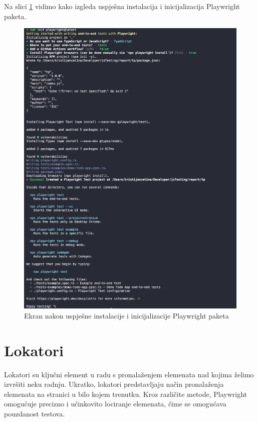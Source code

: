 Na slici \ref{img:pwInit} vidimo kako izgleda uspješna instalacija i inicijalizacija Playwright paketa.
\begin{figure}[!h]\begin{center}
    \includegraphics[width=1\textwidth]{"img/pwInit"}
    \caption{Ekran nakon uspješne instalacije i inicijalizacije Playwright paketa}\label{img:pwInit}
\end{center}\end{figure}

\section{Lokatori}

Lokatori su ključni element u radu s pronalaženjem elemenata nad kojima želimo izvršiti neku radnju.
Ukratko, lokatori predstavljaju način pronalaženja elemenata na stranici u bilo kojem trenutku.
Kroz različite metode, Playwright omogućuje precizno i učinkovito lociranje elemenata, čime se omogućava pouzdanost testova.

